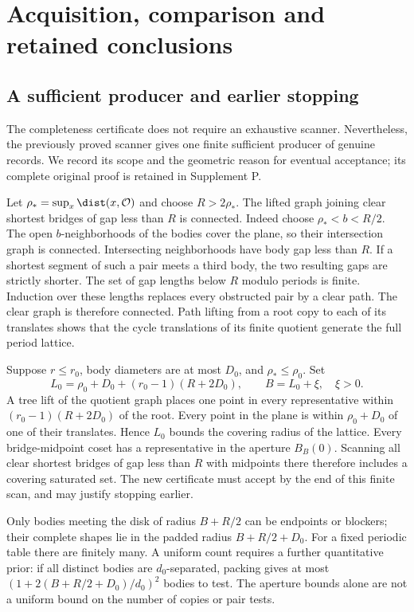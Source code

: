 \section{Acquisition, comparison and retained conclusions}\label{sec:acquisition}
\subsection{A sufficient producer and earlier stopping}
The completeness certificate does not require an exhaustive scanner.
Nevertheless, the previously proved scanner gives one finite sufficient
producer of genuine records. We record its scope and the geometric
reason for eventual acceptance; its complete original proof is retained
in Supplement P.

Let $\rho_* =\sup_x\dist(x,\mathcal O)$ and choose $R>2\rho_*$.
The lifted graph joining clear shortest bridges of gap less than $R$
is connected. Indeed choose $\rho_*<b<R/2$. The open $b$-neighborhoods
of the bodies cover the plane, so their intersection graph is connected.
Intersecting neighborhoods have body gap less than $R$. If a shortest
segment of such a pair meets a third body, the two resulting gaps are
strictly shorter. The set of gap lengths below $R$ modulo periods is
finite. Induction over these lengths replaces every obstructed pair by
a clear path. The clear graph is therefore connected. Path lifting from
a root copy to each of its translates shows that the cycle translations
of its finite quotient generate the full period lattice.

Suppose $r\le r_0$, body diameters are at most $D_0$, and
$\rho_*\le\rho_0$. Set
\[
 L_0=\rho_0+D_0+(r_0-1)(R+2D_0),\qquad B=L_0+\xi,\quad\xi>0.
\]
A tree lift of the quotient graph places one point in every representative
within $(r_0-1)(R+2D_0)$ of the root. Every point in the plane is
within $\rho_0+D_0$ of one of their translates. Hence $L_0$ bounds
the covering radius of the lattice. Every bridge-midpoint coset has a
representative in the aperture $B_B(0)$. Scanning all clear shortest
bridges of gap less than $R$ with midpoints there therefore includes
a covering saturated set. The new certificate must accept by the end
of this finite scan, and may justify stopping earlier.

Only bodies meeting the disk of radius $B+R/2$ can be endpoints or
blockers; their complete shapes lie in the padded radius $B+R/2+D_0$.
For a fixed periodic table there are finitely many. A uniform count
requires a further quantitative prior: if all distinct bodies are
$d_0$-separated, packing gives at most
$(1+2(B+R/2+D_0)/d_0)^2$ bodies to test. The aperture bounds alone
are not a uniform bound on the number of copies or pair tests.

